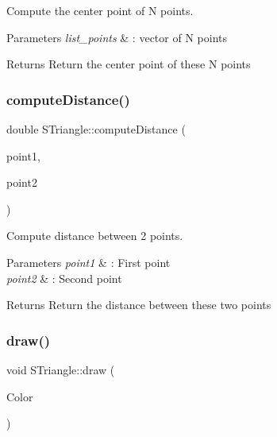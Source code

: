 Compute the center point of N points. 


\begin{DoxyParams}{Parameters}
{\em list\+\_\+points} & \+: vector of N points \\
\hline
\end{DoxyParams}
\begin{DoxyReturn}{Returns}
Return the center point of these N points 
\end{DoxyReturn}
\mbox{\label{classSTriangle_adf0766a2d910a37615a1a7112030bd94}} 
\subsubsection{\texorpdfstring{compute\+Distance()}{computeDistance()}}
{\footnotesize\ttfamily double S\+Triangle\+::compute\+Distance (\begin{DoxyParamCaption}\item[{\hyperlink{classPoint}{Point}$<$ double $>$}]{point1,  }\item[{\hyperlink{classPoint}{Point}$<$ double $>$}]{point2 }\end{DoxyParamCaption})}



Compute distance between 2 points. 


\begin{DoxyParams}{Parameters}
{\em point1} & \+: First point \\
\hline
{\em point2} & \+: Second point \\
\hline
\end{DoxyParams}
\begin{DoxyReturn}{Returns}
Return the distance between these two points 
\end{DoxyReturn}
\mbox{\label{classSTriangle_a7eddfc5b9e5b2951ba71b085345d87d1}} 
\subsubsection{\texorpdfstring{draw()}{draw()}}
{\footnotesize\ttfamily void S\+Triangle\+::draw (\begin{DoxyParamCaption}\item[{M\+L\+V\+\_\+\+Color}]{Color }\end{DoxyParamCaption})}



